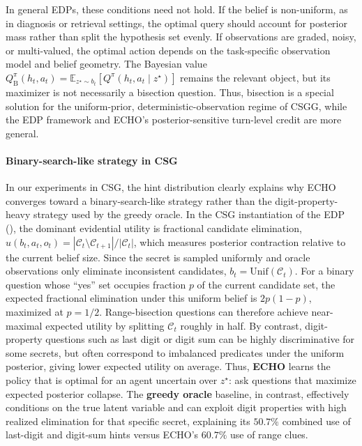 \documentclass[11pt]{article}
\theoremstyle{plain}
\theoremstyle{definition}
\theoremstyle{remark}
\begin{document}
In general EDPs, these conditions need not hold. If the belief is non-uniform, as in diagnosis or retrieval settings, the optimal query should account for posterior mass rather than split the hypothesis set evenly. If observations are graded, noisy, or multi-valued, the optimal action depends on the task-specific observation model and belief geometry. The Bayesian value \(Q^\pi_{\mathrm{B}}(h_t,a_t)=\mathbb{E}_{z^\star\sim b_t}[Q^\pi(h_t,a_t\mid z^\star)]\) remains the relevant object, but its maximizer is not necessarily a bisection question. Thus, bisection is a special solution for the uniform-prior, deterministic-observation regime of CSGG, while the EDP framework and \textsc{ECHO}'s posterior-sensitive turn-level credit are more general.

\paragraph{Binary-search-like strategy in CSG} In our experiments in CSG, the hint distribution clearly explains why \textsc{ECHO} converges toward a binary-search-like strategy rather than the digit-property-heavy strategy used by the greedy oracle. In the CSG instantiation of the EDP (), the dominant evidential utility is fractional candidate elimination,
\(u(b_t,a_t,o_t)=|\mathcal{C}_t\setminus\mathcal{C}_{t+1}|/|\mathcal{C}_t|\), which measures posterior contraction relative to the current belief size. Since the secret is sampled uniformly and oracle observations only eliminate inconsistent candidates, \(b_t=\mathrm{Unif}(\mathcal{C}_t)\). For a binary question whose ``yes'' set occupies fraction \(p\) of the current candidate set, the expected fractional elimination under this uniform belief is \(2p(1-p)\), maximized at \(p=1/2\). Range-bisection questions can therefore achieve near-maximal expected utility by splitting \(\mathcal{C}_t\) roughly in half. By contrast, digit-property questions such as last digit or digit sum can be highly discriminative for some secrets, but often correspond to imbalanced predicates under the uniform posterior, giving lower expected utility on average. Thus, \textbf{\textsc{ECHO}} learns the policy that is optimal for an agent uncertain over \(z^\star\): ask questions that maximize expected posterior collapse. The \textbf{greedy oracle} baseline, in contrast, effectively conditions on the true latent variable and can exploit digit properties with high realized elimination for that specific secret, explaining its \(50.7\%\) combined use of last-digit and digit-sum hints versus \textsc{ECHO}'s \(60.7\%\) use of range clues.
\end{document}

